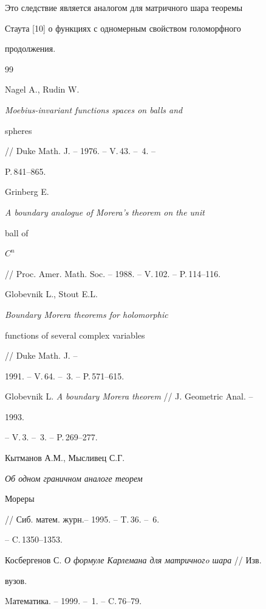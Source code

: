 \medskip 


 


Это следствие является аналогом для матричного шара теоремы 


Стаута [10] о функциях с одномерным свойством голоморфного 


продолжения. 


 


\begin{thebibliography}{99} 


 




Nagel A., Rudin W. {\em Moebius-invariant functions spaces on balls and 


spheres} // Duke Math. J. -- 1976. -- V.\,43. -- \No\,4. -- 


P.\,841--865. 




Grinberg E. {\em A boundary analogue of Morera's theorem on the unit 


ball of 


$C^n$} // Proc. Amer. Math. Soc. -- 1988. -- V.\,102. -- P.\,114--116. 




Globevnik L., Stout E.L. {\em Boundary Morera theorems for holomorphic 


functions of several complex variables} // Duke Math. J. -- 


1991. -- V.\,64. -- \No\,3. -- P.\,571--615. 




Globevnik L. {\em A boundary Morera theorem} // J. Geometric Anal. -- 


1993. 


-- V.\,3. -- \No\,3. -- P.\,269--277. 




Кытманов А.М., Мысливец С.Г. {\em Об одном граничном аналоге теорем 


Мореры} // Сиб. матем. журн.-- 1995. -- T.\,36. -- \No\,6. 


-- C.\,1350--1353. 




Косбергенов С. {\em О формуле Карлемана для матричногo шара} // Изв. 


вузов. 


Mатематика. -- 1999. -- \No\,1. -- C.\,76--79. 



\end{thebibliography}
